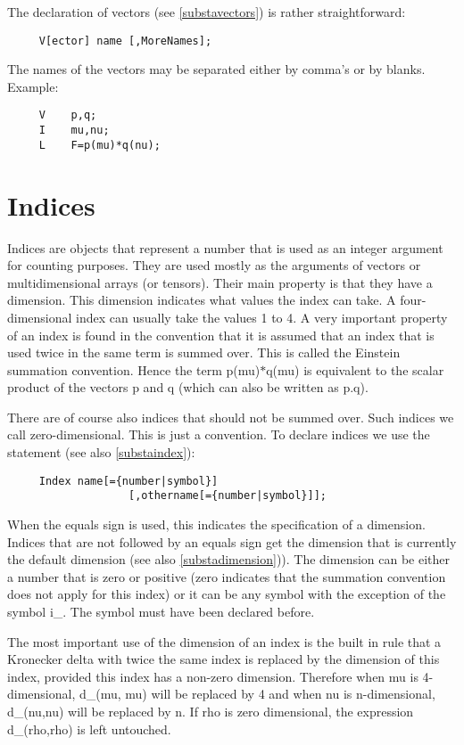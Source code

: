 The declaration of vectors (see \ref{substavectors}) is rather 
straightforward:
\begin{verbatim}
     V[ector] name [,MoreNames];
\end{verbatim}
The names of the vectors may be separated either by comma's or 
by blanks. Example: 
\begin{verbatim}
     V    p,q;
     I    mu,nu;
     L    F=p(mu)*q(nu);
\end{verbatim}

\section{Indices}

\label{sect-indices}
Indices are objects that represent a number 
that is used as an integer argument for counting purposes. They are used 
mostly as the arguments of vectors or multidimensional arrays (or tensors). 
Their main property is that they have a dimension. This 
dimension indicates what values the index can take. A four-dimensional 
index can usually take the values 1 to 4. A very important property of an 
index is found in the convention that it is assumed that an index that is 
used twice in the same term is summed over. This is called the 
Einstein summation convention. 
Hence the term p(mu)$*$q(mu) is equivalent to the scalar product of the 
vectors p and q (which can also be written as p.q). 

There are of course also indices that should not be summed over. 
Such indices we call zero-dimensional. This is just a convention. 
To declare indices we use the statement (see also \ref{substaindex}): 
\begin{verbatim}
     Index name[={number|symbol}]
                   [,othername[={number|symbol}]];
\end{verbatim}
When the equals sign is used, this indicates the specification of a 
dimension. Indices that are not followed by an equals sign get the 
dimension that is currently the default dimension (see also 
\ref{substadimension})). The dimension can be either a number that is 
zero or positive (zero indicates that the summation convention does not 
apply for this index) or it can be any symbol with the exception of the 
symbol i\_. The symbol must have been declared before. 

The most important use of the dimension of an index is the built in rule 
that a Kronecker delta with twice 
the same index is replaced by the dimension of this index, provided this 
index has a non-zero dimension. Therefore when mu is 4-dimensional, d\_(mu,
mu) will be replaced by 4 and when nu is n-dimensional, d\_(nu,nu) will be 
replaced by n. If rho is zero dimensional, the expression d\_(rho,rho) is 
left untouched.

